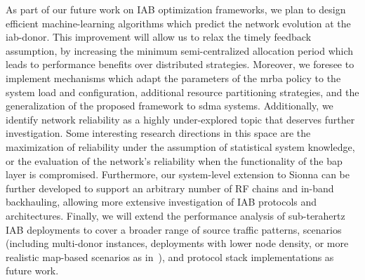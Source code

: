 As part of our future work on IAB optimization frameworks, we plan to design efficient machine-learning algorithms which predict the network evolution at the \gls{iab}-donor. This improvement will allow us to relax the timely feedback assumption, by increasing the minimum semi-centralized allocation period which leads to performance benefits over distributed strategies. Moreover, we foresee to implement mechanisms which adapt the parameters of the \gls{mrba} policy to the system load and configuration, additional resource partitioning strategies, and the generalization of the proposed framework to \gls{sdma} systems. 
Additionally, we identify network reliability as a highly under-explored topic that deserves further investigation. Some interesting research directions in this space are the maximization of reliability under the assumption of statistical system knowledge, or the evaluation of the network's reliability when the functionality of the \gls{bap} layer is compromised. Furthermore, our system-level extension to Sionna can be further developed to support an arbitrary number of RF chains and in-band backhauling, allowing more extensive investigation of IAB protocols and architectures.
Finally, we will extend the performance analysis of sub-terahertz IAB deployments to cover a broader range of source traffic patterns, scenarios (including multi-donor instances, deployments with lower node density, or more realistic map-based scenarios as in~\cite{gemmi2023on,gemmi2022on}), and protocol stack implementations as future work.